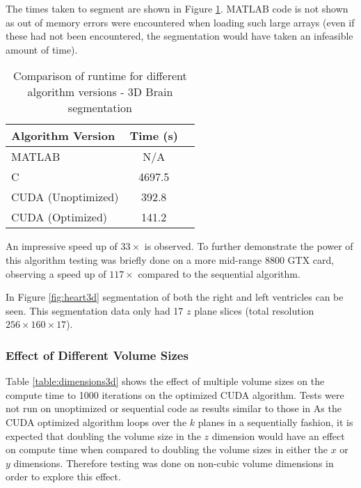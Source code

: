 The times taken to segment are shown in Figure \ref{brain3dtime}. MATLAB code is not shown as out of memory errors were encountered when loading such large arrays (even if these had not been encountered, the segmentation would have taken an infeasible amount of time).

\begin{table}[h]
\centering
\begin{tabular}{ | l | c | r | }
	\hline
	Algorithm Version  & Time (s)\\ \hline
  MATLAB 						 & N/A \\
  C 								 & 4697.5 \\
  CUDA (Unoptimized) & 392.8 \\
  CUDA (Optimized)   & 141.2  \\
  \hline
\end{tabular}\caption{Comparison of runtime for different algorithm versions - 3D Brain segmentation}
\label{brain3dtime}
\end{table}

An impressive speed up of $33 \times$ is observed. To further demonstrate the power of this algorithm testing was briefly done on a more mid-range 8800 GTX card, observing a speed up of $117 \times$ compared to the sequential algorithm.

In Figure \ref{fig:heart3d} segmentation of both the right and left ventricles can be seen. This segmentation data only had 17 $z$ plane slices (total resolution $256 \times 160 \times 17$).


\subsubsection{Effect of Different Volume Sizes}\label{dimensions3d}


Table \ref{table:dimensions3d} shows the effect of multiple volume sizes on the compute time to 1000 iterations on the optimized CUDA algorithm. Tests were not run on unoptimized or sequential code as results similar to those in 
As the CUDA optimized algorithm loops over the $k$ planes in a sequentially fashion, it is expected that doubling the volume size in the $z$ dimension would have an effect on compute time when compared to doubling the volume sizes in either the $x$ or $y$ dimensions. Therefore testing was done on non-cubic volume dimensions in order to explore this effect.

